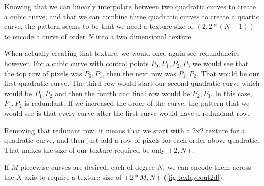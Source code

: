 \documentclass{jcgt}
\begin{document}
Knowing that we can linearly interpolate between two quadratic curves to create a cubic curve, and that we can combine three quadratic curves to create a quartic curve, the pattern seems to be that we need a texture size of $(2,2*(N-1))$ to encode a curve of order $N$ into a two dimensional texture.

When actually creating that texture, we would once again see redundancies however.  For a cubic curve with control points $P_0,P_1,P_2,P_3$ we would see that the top row of pixels was $P_0,P_1$, then the next row was $P_1,P_2$.  That would be our first quadratic curve.  The third row would start our second quadratic curve which would be $P_1,P_2$ and then the fourth and final row would be $P_2,P_3$.  In this case, $P_1,P_2$ is redundant.  If we increased the order of the curve, the pattern that we would see is that every curve after the first curve would have a redundant row.

Removing that redunant row, it means that we start with a $2$x$2$ texture for a quadratic curve, and then just add a row of pixels for each order above quadratic.  That makes the size of our texture required be only $(2,N)$.

If $M$ piecewise curves are desired, each of degree $N$, we can encode them across the $X$ axis to require a texture size of $(2*M,N)$ (\autoref{fig:texlayeout2d}).
\end{document}

